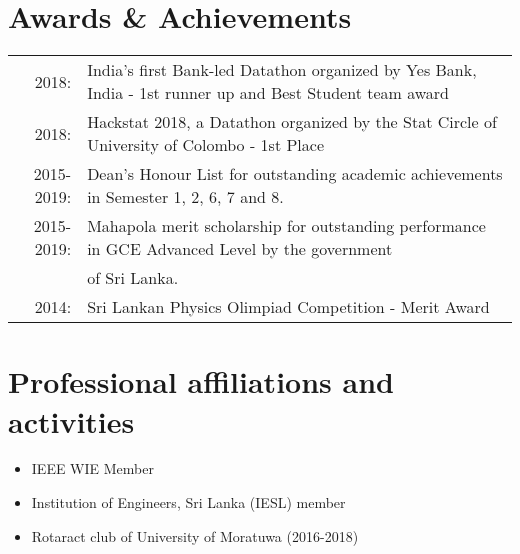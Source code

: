 \documentclass[a4paper,11pt]{article}
\begin{document}
\section{Awards \& Achievements}
\begin{tabular}{rl}
 2018:& {India's first Bank-led Datathon organized by Yes Bank, India - 1st runner up and Best Student team award}\\
2018:& {Hackstat 2018, a Datathon organized by the Stat Circle of University of Colombo - 1st Place}\\
2015-2019:&  {Dean's Honour List for outstanding academic achievements in Semester 1, 2, 6, 7 and 8.}\\2015-2019:&  {Mahapola merit scholarship for outstanding performance in GCE Advanced Level by the government} \\&{of Sri Lanka.}
\\2014:& {Sri Lankan Physics Olimpiad Competition - Merit Award}\\
\end{tabular}

\bigskip


\section{Professional affiliations and activities}
\begin{itemize}
\setlength\itemsep{0.01em}
  \item IEEE WIE Member
  \item Institution of Engineers, Sri Lanka (IESL) member
  \item Rotaract club of University of Moratuwa (2016-2018)
\end{itemize}
\end{document}
